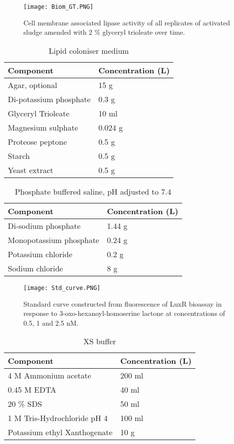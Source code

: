 \documentclass[11pt]{article}
\begin{document}
\begin{figure}
\texttt{[image: Biom\_GT.PNG]}
\caption{Cell membrane associated lipase activity of all replicates of activated sludge amended with 2 \% glyceryl trioleate over time.}
\end{figure}
\FloatBarrier

\begin{table}
\caption{Lipid coloniser medium}
\begin{tabular}{  p{6.9cm} | p{6.9cm} }
\hline
Component & Concentration (L) \\
\hline
Agar, optional  & 15 g  \\
  Di-potassium phosphate  & 0.3 g \\
   Glyceryl Trioleate   & 10 ml \\
      Magnesium sulphate  & 0.024 g  \\
       Proteose peptone   & 0.5 g \\
          Starch  & 0.5 g \\
           Yeast extract   & 0.5 g \\
  \hline
\end{tabular}
\end{table}


\begin{table}
\caption{Phosphate buffered saline, pH adjusted to 7.4}
\begin{tabular}{  p{6.9cm} | p{6.9cm}  }
\hline
Component & Concentration (L) \\
\hline
Di-sodium phosphate  & 1.44 g \\
  Monopotassium phosphate  & 0.24 g  \\
    Potassium chloride  &  0.2 g  \\
      Sodium chloride  & 8 g  \\
  \hline
\end{tabular}
\end{table}

\begin{figure}
\texttt{[image: Std\_curve.PNG]}
\caption{Standard curve constructed from fluorescence of LuxR bioassay in response to 3-oxo-hexanoyl-homoserine lactone at concentrations of 0.5, 1 and 2.5 nM.}
\end{figure}
\FloatBarrier

\begin{table}
\caption{XS buffer}
\begin{tabular}{  p{6.9cm} | p{6.9cm}  }
\hline
Component & Concentration (L) \\
\hline
 4 M Ammonium acetate & 200 ml  \\
  0.45 M EDTA  & 40 ml \\
    20 \% SDS  & 50 ml \\
    1 M Tris-Hydrochloride pH 4    & 100 ml  \\
        Potassium ethyl Xanthogenate  & 10 g  \\
  \hline
\end{tabular}
\end{table}
\end{document}
